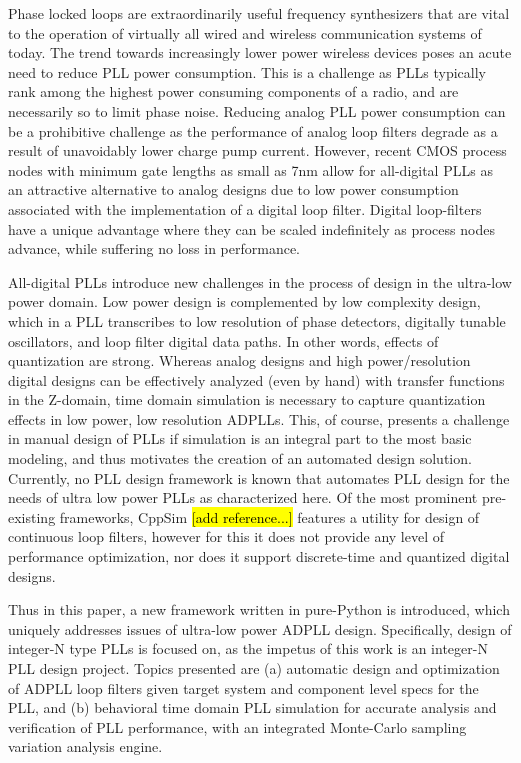 Phase locked loops are extraordinarily useful frequency synthesizers that are vital to the operation of virtually all wired and wireless communication systems of today. The trend towards increasingly lower power wireless devices poses an acute need to reduce PLL power consumption. This is a challenge as PLLs typically rank among the highest power consuming components of a radio, and are necessarily so to limit phase noise. Reducing analog PLL power consumption can be a prohibitive challenge as the performance of analog loop filters degrade as a result of unavoidably lower charge pump current. However, recent CMOS process nodes with minimum gate lengths as small as 7nm allow for all-digital PLLs as an attractive alternative to analog designs due to low power consumption associated with the implementation of a digital loop filter. Digital loop-filters have a unique advantage where they can be scaled indefinitely as process nodes advance, while suffering no loss in performance. 

All-digital PLLs introduce new challenges in the process of design in the ultra-low power domain. Low power design is complemented by low complexity design, which in a PLL transcribes to low resolution of phase detectors, digitally tunable oscillators, and loop filter digital data paths. In other words, effects of quantization are strong. Whereas analog designs and high power/resolution digital designs can be effectively analyzed (even by hand) with transfer functions in the Z-domain, time domain simulation is necessary to capture quantization effects in low power, low resolution ADPLLs. This, of course, presents a challenge in manual design of PLLs if simulation is an integral part to the most basic modeling, and thus motivates the creation of an automated design solution. Currently, no PLL design framework is known that automates PLL design for the needs of ultra low power PLLs as characterized here. Of the most prominent pre-existing frameworks, CppSim \hl{[add reference...]} features a utility for design of continuous loop filters, however for this it does not provide any level of performance optimization, nor does it support discrete-time and quantized digital designs. 

Thus in this paper, a new framework written in pure-Python is introduced, which uniquely addresses issues of ultra-low power ADPLL design. Specifically, design of integer-N type PLLs is focused on, as the impetus of this work is an integer-N PLL design project. Topics presented are (a) automatic design and optimization of ADPLL loop filters given target system and component level specs for the PLL, and (b) behavioral time domain PLL simulation for accurate analysis and verification of PLL performance, with an integrated Monte-Carlo sampling variation analysis engine.

